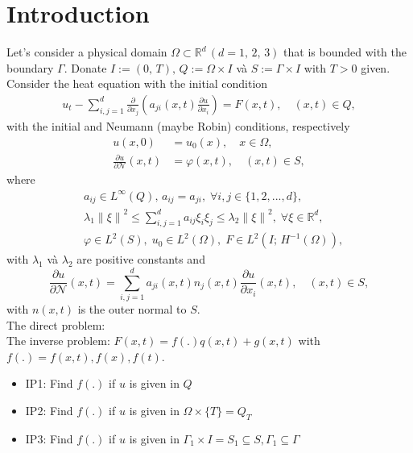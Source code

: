 \documentclass[]{article}
\begin{document}
\justifying

\thispagestyle{empty}
	
\newpage
\section{Introduction}
Let's consider a physical domain $\Omega \subset \mathbb{R}^d\,(d=1,\, 2,\, 3)$ that is bounded with the boundary $\Gamma$. Donate $I:=(0,\, T),\, Q:=\Omega\times I$ và $ S:=\Gamma \times I$ with $T>0$ given. 
\\
Consider the heat equation with the initial condition
\begin{align}
	u_t-\sum_{i, j=1}^{d}\frac{\partial}{\partial x_j}\left(a_{ji}(x, t)\frac{\partial u}{\partial x_i}\right)=F(x, t), \quad(x, t)\in Q,\label{1.1}
\end{align}
with the initial and Neumann (maybe Robin) conditions, respectively
\begin{align}
	u(x, 0)&=u_0(x),\quad x\in \Omega,\label{1.2}\\
	\frac{\partial u}{\partial \mathcal{N}}(x, t)&=\varphi(x, t),\quad(x, t)\in S,\label{1.3}
\end{align}
where
\begin{align*}
	&a_{ij}\in L^{\infty}(Q),\, a_{ij}=a_{ji},\; \forall i, j\in \{1, 2, ..., d\},\\
	&\lambda_1\left\|\xi\right\|^2\leq \sum_{i, j=1}^{d}a_{ij}\xi_i\xi_j\leq \lambda_2\left\|\xi\right\|^2,\; \forall \xi\in\mathbb{R}^d,\\
	&\varphi\in L^2(S),\; u_0\in L^2(\Omega),\; F\in L^2(I;\, H^{-1}(\Omega)),
\end{align*}
with $\lambda_1$ và $\lambda_2$ are positive constants and 
$$\frac{\partial u}{\partial \mathcal{N}}(x, t)=\sum_{i, j=1}^d a_{ji}(x, t)n_j(x, t)\frac{\partial u}{\partial x_i}(x, t),\quad (x, t)\in S,$$
with $n(x, t)$ is the outer normal to $S$.
\\
The direct problem: 
\\
The inverse problem: $F(x, t) = f(.) q(x, t) + g(x, t)$ with $f(.)=f(x, t), f(x), f(t)$.
\begin{itemize}
	\item IP1: Find $f(.)$ if $u$ is given in $Q$
	\item IP2: Find $f(.)$ if $u$ is given in $\Omega\times \{T\}=Q_T$
	\item IP3: Find $f(.)$ if $u$ is given in $\Gamma_1\times I =S_1\subseteq S, \Gamma_1\subseteq \Gamma$
\end{itemize}
\end{document}
